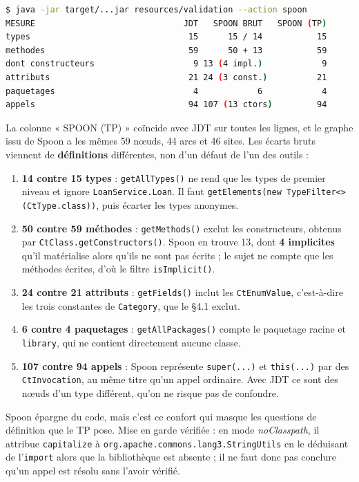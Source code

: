\documentclass[11pt,a4paper]{article}
\begin{document}
\begin{lstlisting}[language=bash]
$ java -jar target/...jar resources/validation --action spoon
MESURE                              JDT   SPOON BRUT   SPOON (TP)
types                                15      15 / 14           15
methodes                             59      50 + 13           59
dont constructeurs                    9 13 (4 impl.)            9
attributs                            21 24 (3 const.)          21
paquetages                            4            6            4
appels                               94 107 (13 ctors)         94
\end{lstlisting}

La colonne « SPOON (TP) » coïncide avec JDT sur toutes les lignes, et le graphe issu de Spoon a les mêmes 59 n\oe{}uds, 44 arcs et 46 sites. Les écarts bruts viennent de \textbf{définitions} différentes, non d'un défaut de l'un des outils :

\begin{enumerate}
    \item \textbf{14 contre 15 types} : \texttt{getAllTypes()} ne rend que les types de premier niveau et ignore \texttt{LoanService.Loan}. Il faut \texttt{getElements(new TypeFilter<>(CtType.class))}, puis écarter les types anonymes.
    \item \textbf{50 contre 59 méthodes} : \texttt{getMethods()} exclut les constructeurs, obtenus par \texttt{CtClass.getConstructors()}. Spoon en trouve 13, dont \textbf{4 implicites} qu'il matérialise alors qu'ils ne sont pas écrits ; le sujet ne compte que les méthodes écrites, d'où le filtre \texttt{isImplicit()}.
    \item \textbf{24 contre 21 attributs} : \texttt{getFields()} inclut les \texttt{CtEnumValue}, c'est-à-dire les trois constantes de \texttt{Category}, que le §4.1 exclut.
    \item \textbf{6 contre 4 paquetages} : \texttt{getAllPackages()} compte le paquetage racine et \texttt{library}, qui ne contient directement aucune classe.
    \item \textbf{107 contre 94 appels} : Spoon représente \texttt{super(...)} et \texttt{this(...)} par des \texttt{CtInvocation}, au même titre qu'un appel ordinaire. Avec JDT ce sont des n\oe{}uds d'un type différent, qu'on ne risque pas de confondre.
\end{enumerate}

Spoon épargne du code, mais c'est ce confort qui masque les questions de définition que le TP pose. Mise en garde vérifiée : en mode \textit{noClasspath}, il attribue \texttt{capitalize} à \texttt{org.apache.commons.lang3.StringUtils} en le déduisant de l'\texttt{import} alors que la bibliothèque est absente ; il ne faut donc pas conclure qu'un appel est résolu sans l'avoir vérifié.
\end{document}
